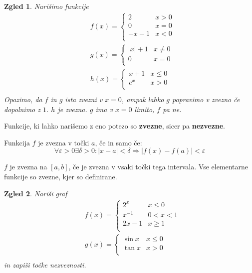 \documentclass{article}
\newtheorem*{zgled}{Zgled}
\begin{document}
\begin{zgled}
    Narišimo funkcije
    \begin{align*}
        &f(x) = 
             \begin{cases}
               2 & x>0\\
               0 &x=0 \\
               -x-1 &x<0\\
             \end{cases}\\
        &g(x) = 
             \begin{cases}
               |x|+1 & x\neq 0\\
               0 &x=0\\
             \end{cases}\\
        &h(x) = 
             \begin{cases}
               x+1 & x\leq 0\\
               e^x &x>0\\
             \end{cases}\\
    \end{align*}
    Opazimo, da $f$ in $g$ ista zvezni v $x=0$, ampak lahko $g$ popravimo v zvezno če dopolnimo z $1$. $h$ je zvezna. $g$ ima v $x=0$ limito, $f$ pa ne.
\end{zgled}

Funkcije, ki lahko narišemo z eno potezo so \textbf{zvezne}, sicer pa \textbf{nezvezne}.

Funkcija $f$ je zvezna v točki $a$, če in samo če:
\[\forall \varepsilon >0 \exists \delta >0: |x-a|<\delta \Rightarrow |f(x)-f(a)|<\varepsilon\]

$f$ je zvezna na $[a,b]$, če je zvezna v vsaki točki tega intervala. Vse elementarne funkcije so zvezne, kjer so definirane.


\begin{zgled}
    Nariši graf
    \begin{align*}
        &f(x) = 
             \begin{cases}
               2^x & x\leq 0\\
               x^{-1} &0<x<1 \\
               2x-1 &x\geq 1\\
             \end{cases}\\
        &g(x) = 
             \begin{cases}
               \sin x & x\leq 0\\
               \tan x &x>0\\
             \end{cases}\\
    \end{align*}
    in zapiši točke nezveznosti.
\end{zgled}
\end{document}
